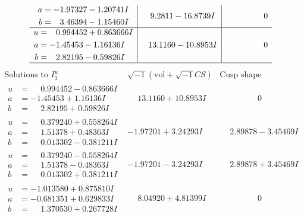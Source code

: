 \documentclass[1p]{elsarticle_modified}
\theoremstyle{definition}
\newcommand{\I}{\sqrt{-1}}
\begin{document}
$$\begin{array}{c|c|c}
\begin{aligned}
a &= -1.97327 - 1.20741 I \\
b &= \phantom{-}3.46394 - 1.15460 I\end{aligned}
 & \phantom{-}9.2811 - 16.8739 I & \phantom{-0.000000 } 0 \\ \hline\begin{aligned}
u &= \phantom{-}0.994452 + 0.863666 I \\
a &= -1.45453 - 1.16136 I \\
b &= \phantom{-}2.82195 - 0.59826 I\end{aligned}
 & \phantom{-}13.1160 - 10.8953 I & \phantom{-0.000000 } 0\\
 \hline 
 \end{array}$$\newpage$$\begin{array}{c|c|c}  
\text{Solutions to }I^u_{1}& \I (\text{vol} + \sqrt{-1}CS) & \text{Cusp shape}\\
 \hline 
\begin{aligned}
u &= \phantom{-}0.994452 - 0.863666 I \\
a &= -1.45453 + 1.16136 I \\
b &= \phantom{-}2.82195 + 0.59826 I\end{aligned}
 & \phantom{-}13.1160 + 10.8953 I & \phantom{-0.000000 } 0 \\ \hline\begin{aligned}
u &= \phantom{-}0.379240 + 0.558264 I \\
a &= \phantom{-}1.51378 + 0.48363 I \\
b &= \phantom{-}0.013302 - 0.381211 I\end{aligned}
 & -1.97201 + 3.24293 I & \phantom{-}2.89878 - 3.45469 I \\ \hline\begin{aligned}
u &= \phantom{-}0.379240 - 0.558264 I \\
a &= \phantom{-}1.51378 - 0.48363 I \\
b &= \phantom{-}0.013302 + 0.381211 I\end{aligned}
 & -1.97201 - 3.24293 I & \phantom{-}2.89878 + 3.45469 I \\ \hline\begin{aligned}
u &= -1.013580 + 0.875810 I \\
a &= -0.681351 + 0.629833 I \\
b &= \phantom{-}1.370530 + 0.267728 I\end{aligned}
 & \phantom{-}8.04920 + 4.81399 I & \phantom{-0.000000 } 0 \\ \hline\begin{aligned}

\end{aligned}
\end{array}$$
\end{document}
